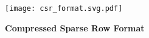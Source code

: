 \begin{figure}[tp]
    \centering
    \texttt{[image: csr\_format.svg.pdf]}
    \caption[Compressed Sparse Row Format]{
      \textbf{Compressed Sparse Row Format}
    }
    \label{fig-spz-csr-format}
\end{figure}
